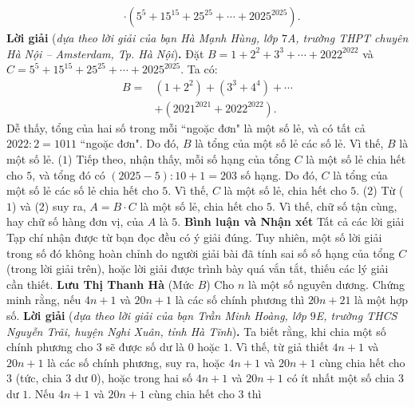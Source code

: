 \begin{multicols}{2}
\begin{align*}
		&\cdot\left(5^5+15^{15}+25^{25}+\cdots +2025^{2025}\right).
	\end{align*}
	\textbf{\color{thachthuctoanhoc}Lời giải} (\textit{dựa theo lời giải của bạn Hà Mạnh Hùng, lớp $7$A, trường THPT chuyên Hà Nội -- Amsterdam, Tp. Hà Nội})\textbf{\color{thachthuctoanhoc}.}
	\vskip 0.05cm
	Đặt  $B = 1 + {2^2} + {3^3} +  \cdots  + {2022^{2022}}$ và $C = {5^5} + {15^{15}} + {25^{25}} +  \cdots  + {2025^{2025}}$.
	\vskip 0.05cm 
	Ta có:
	\begin{align*}
		B = &\left( {1 + {2^2}} \right) + \left( {{3^3} + {4^4}} \right) +  \cdots\\
		  &+ \left( {{{2021}^{2021}} + {{2022}^{2022}}} \right).
	\end{align*}
	Dễ thấy, tổng của hai số trong mỗi ``ngoặc đơn" là một số lẻ, và có tất cả $2022 : 2 = 1011$ ``ngoặc đơn". Do đó, $B$ là tổng của một số lẻ các số lẻ. Vì thế, $B$ là một số lẻ.   \hfill ($1$)
	\vskip 0.05cm
	Tiếp theo, nhận thấy, mỗi số hạng của tổng $C$ là một số lẻ chia hết cho $5$, và tổng đó có $(2025 - 5) : 10 + 1 = 203$ số hạng. Do đó, $C$ là tổng của một số lẻ các số lẻ chia hết cho $5$. Vì thế, $C$ là một số lẻ, chia hết cho $5$. \hfill ($2$)
	\vskip 0.05cm
	Từ ($1$) và ($2$) suy ra, $A = B \cdot C$  là một số lẻ, chia hết cho $5$. Vì thế, chữ số tận cùng, hay chữ số hàng đơn vị, của $A$ là $5$.
	\vskip 0.05cm
	\textbf{\color{thachthuctoanhoc}Bình luận và Nhận xét}
	\vskip 0.05cm
	Tất cả các lời giải Tạp chí nhận được từ bạn đọc đều có ý giải đúng. Tuy nhiên, một số lời giải trong số đó không hoàn chỉnh do người giải bài đã tính sai số số hạng của tổng $C$ (trong lời giải trên), hoặc lời giải được trình bày quá vắn tắt, thiếu các lý giải cần thiết.
	\vskip 0.05cm
	\hfill	\textbf{\color{thachthuctoanhoc}Lưu Thị Thanh Hà}
	\vskip 0.05cm
	{}
	(Mức $B$) Cho $n$ là một số nguyên dương. Chứng minh rằng, nếu $4n+1$ và $20n+1$ là các số chính phương thì $20n+21$ là một hợp số.
	\vskip 0.05cm
	\textbf{\color{thachthuctoanhoc}Lời giải} (\textit{dựa theo lời giải của bạn Trần Minh Hoàng, lớp $9$E, trường THCS Nguyễn Trãi, huyện Nghi Xuân, tỉnh Hà Tĩnh})\textbf{\color{thachthuctoanhoc}.}
	\vskip 0.05cm
	Ta biết rằng, khi chia một số chính phương cho $3$ sẽ được số dư là $0$ hoặc $1$. Vì thế, từ giả thiết $4n + 1$ và $20n + 1$ là các số chính phương, suy ra, hoặc $4n + 1$ và $20n + 1$ cùng chia hết cho $3$ (tức, chia $3$ dư $0$), hoặc trong hai số $4n + 1$ và $20n + 1$ có ít nhất một số chia $3$ dư $1$.
	\vskip 0.05cm
	Nếu $4n + 1$ và $20n + 1$ cùng chia hết cho $3$ thì

\end{multicols}
